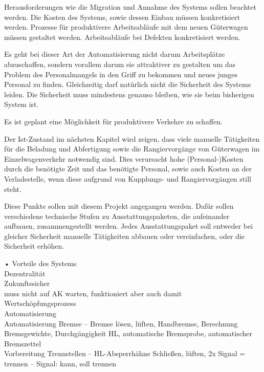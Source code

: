 Herausforderungen wie die Migration und Annahme des Systems sollen beachtet werden. Die Kosten des Systems, sowie dessen Einbau müssen konkretisiert werden. Prozesse für produktivere Arbeitsabläufe mit dem neuen Güterwagen müssen gestaltet werden. Arbeitsabläufe bei Defekten konkretisiert werden.\par
Es geht bei dieser Art der Automatisierung nicht darum Arbeitsplätze abzuschaffen, sondern vorallem darum sie attraktiver zu gestalten um das Problem des Personalmangels in den Griff zu bekommen und neues junges Personal zu finden. Gleichzeitig darf natürlich nicht die Sicherheit des Systems leiden. Die Sicherheit muss mindestens genauso bleiben, wie sie beim bisherigen System ist.\par
Es ist geplant eine Möglichkeit für produktivere Verkehre zu schaffen.\par
Der Ist-Zustand im nächsten Kapitel wird zeigen, dass viele manuelle Tätigkeiten für die Beladung und Abfertigung sowie die Rangiervorgänge von Güterwagen im Einzelwagenverkehr notwendig sind. Dies verursacht hohe (Personal-)Kosten durch die benötigte Zeit und das benötigte Personal, sowie auch Kosten an der Verladestelle, wenn diese aufgrund von Kupplungs- und Rangiervorgängen still steht.\par
Diese Punkte sollen mit diesem Projekt angegangen werden. Dafür sollen verschiedene technische Stufen zu Ausstattungspaketen, die aufeinander aufbauen, zusammengestellt werden. Jedes Ausstattungspaket soll entweder bei gleicher Sicherheit manuelle Tätigkeiten abbauen oder vereinfachen, oder die Sicherheit erhöhen.\par


• Vorteile des Systems\\
Dezentralität\\
Zukunftssicher\\
muss nicht auf AK warten, funktioniert aber auch damit\\
Wertschöpfungsprozess\\
Automatisierung\\
Automatisierung Bremse – Bremse lösen, lüften, Handbremse, Berechnung Bremsgewichte, Durchgängigkeit HL, automatische Bremsprobe, automatischer Bremszettel\\
Vorbereitung Trennstellen – HL-Absperrhähne Schließen, lüften, 2x Signal = trennen – Signal: kann, soll trennen\\
